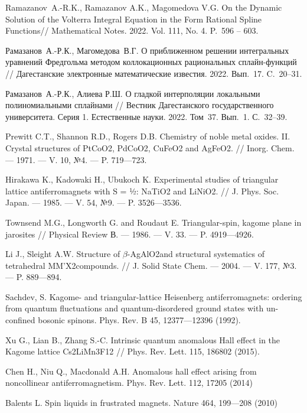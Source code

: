 \begin{thebibliography}{111}
 Ramazanov~A.-R.K., Ramazanov A.K., Magomedova V.G.
On the Dynamic Solution of the Volterra Integral Equation in the Form
Rational Spline Functions// Mathematical Notes. 2022. Vol. 111, No. 4.
P.~596 – 603.

 Рамазанов~А.-Р.К., Магомедова~В.Г.
 О приближенном решении интегральных уравнений Фредгольма методом
коллокационных рациональных сплайн-функций //
Дагестанские электронные математические известия. 2022. Вып.~17. C.~20--31.

 Рамазанов~А.-Р.К., Алиева Р.Ш. О гладкой интерполяции
 локальными полиномиальными сплайнами // Вестник Дагестанского
государственного университета. Серия 1. Естественные науки. 2022. Том~37.
 Вып.~1. С.~32--39.



  Prewitt C.T., Shannon R.D., Rogers D.B.
  Chemistry of noble metal oxides. II. Crystal structures of PtCoO2, PdCoO2, CuFeO2 and AgFeO2.
  //
  Inorg. Chem.
  --- 1971.
  --- V. 10, №4.
  --- P. 719---723.

  Hirakawa K., Kadowaki H., Ubukoch K.
  Experimental studies of triangular lattice antiferromagnets with S = ½: NaTiO2 and LiNiO2.
  //
  J. Phys. Soc. Japan.
  --- 1985.
  --- V. 54, №9.
  --- P. 3526---3536.

  Townsend M.G., Longworth G. and Roudaut E.
  Triangular-spin, kagome plane in jarosites
  //
  Physical Review В.
  --- 1986.
  --- V. 33.
  --- P. 4919---4926.

  Li J., Sleight A.W.
  Structure of $\beta$-AgAlO2and structural systematics of tetrahedral MM'X2compounds.
  //
  J. Solid State Chem.
  --- 2004.
  --- V. 177, №3.
  --- P. 889---894.

  Sachdev, S.
  Kagome- and triangular-lattice Heisenberg antiferromagnets: ordering from quantum fluctuations and quantum-disordered ground states with un-confined bosonic spinons. Phys. Rev. B 45, 12377---12396 (1992).

  Xu G., Lian B., Zhang S.-C.
  Intrinsic quantum anomalous Hall effect in the Kagome lattice Cs2LiMn3F12
  //
  Phys. Rev. Lett. 115, 186802 (2015).

  Chen H., Niu Q., Macdonald A.H.
  Anomalous hall effect arising from noncollinear antiferromagnetism. Phys. Rev. Lett. 112, 17205 (2014)

  Balents L.
  Spin liquids in frustrated magnets. Nature 464, 199---208 (2010)


\end{thebibliography}
